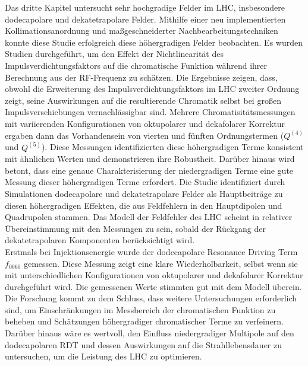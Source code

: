 {%
Das dritte Kapitel untersucht sehr hochgradige Felder im LHC, insbesondere dodecapolare und dekatetrapolare Felder. Mithilfe einer neu implementierten Kollimationsanordnung und maßgeschneiderter Nachbearbeitungstechniken konnte diese Studie erfolgreich diese höhergradigen Felder beobachten. Es wurden Studien durchgeführt, um den Effekt der Nichtlinearität des Impulsverdichtungsfaktors auf die chromatische Funktion während ihrer Berechnung aus der RF-Frequenz zu schätzen. Die Ergebnisse zeigen, dass, obwohl die Erweiterung des Impulsverdichtungsfaktors im LHC zweiter Ordnung zeigt, seine Auswirkungen auf die resultierende Chromatik selbst bei großen Impulsverschiebungen vernachlässigbar sind. Mehrere Chromatisitätsmessungen mit variierenden Konfigurationen von oktupolarer und dekafolarer Korrektur ergaben dann das Vorhandensein von vierten und fünften Ordnungstermen ($Q^{(4)}$ und $Q^{(5)}$). Diese Messungen identifizierten diese höhergradigen Terme konsistent mit ähnlichen Werten und demonstrieren ihre Robustheit. Darüber hinaus wird betont, dass eine genaue Charakterisierung der niedergradigen Terme eine gute Messung dieser höhergradigen Terme erfordert. Die Studie identifiziert durch Simulationen dodecapolare und dekatetrapolare Felder als Hauptbeiträge zu diesen höhergradigen Effekten, die aus Feldfehlern in den Hauptdipolen und Quadrupolen stammen. Das Modell der Feldfehler des LHC scheint in relativer Übereinstimmung mit den Messungen zu sein, sobald der Rückgang der dekatetrapolaren Komponenten berücksichtigt wird.
\\
\indent
Erstmals bei Injektionsenergie wurde der dodecapolare Resonance Driving Term $f_{0060}$ gemessen. Diese Messung zeigt eine klare Wiederholbarkeit, selbst wenn sie mit unterschiedlichen Konfigurationen von oktupolarer und dekafolarer Korrektur durchgeführt wird. Die gemessenen Werte stimmten gut mit dem Modell überein. Die Forschung kommt zu dem Schluss, dass weitere Untersuchungen erforderlich sind, um Einschränkungen im Messbereich der chromatischen Funktion zu beheben und Schätzungen höhergradiger chromatischer Terme zu verfeinern. Darüber hinaus wäre es wertvoll, den Einfluss niedergradiger Multipole auf den dodecapolaren RDT und dessen Auswirkungen auf die Strahllebensdauer zu untersuchen, um die Leistung des LHC zu optimieren.

}
